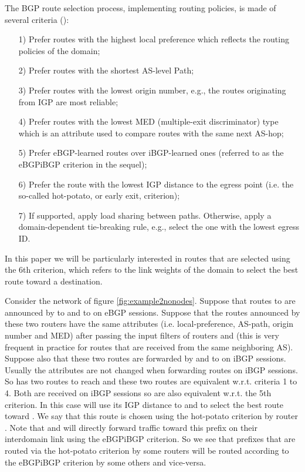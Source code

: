 \documentclass{acm_proc_article-sp}
\begin{document}
The BGP route selection process, implementing routing policies, is made of several criteria (\cite{bgp2,bgp3}):
\begin{itemize}
\item[1)] Prefer routes with the highest local preference which reflects the
  routing policies of the domain;
\item[2)] Prefer routes with the shortest AS-level Path;
\item[3)] Prefer routes with the lowest origin number, e.g., the routes
  originating from IGP are most reliable;
\item[4)] Prefer routes with the lowest MED (multiple-exit discriminator) type
  which is an attribute used to compare routes with the same next AS-hop;
\item[5)] Prefer eBGP-learned routes over iBGP-learned ones 
(referred to as the eBGPiBGP criterion in the sequel);
\item[6)] Prefer the route with the lowest IGP distance to the egress point (i.e. the so-called 
hot-potato, or early exit, criterion);
\item[7)] If supported, apply load sharing between paths. Otherwise, apply a
  domain-dependent tie-breaking rule, e.g., select the one with the lowest
  egress ID.
\end{itemize}

In this paper we will be particularly interested in routes that
are selected using the 6th criterion, which refers to the link weights of the
domain to select the best route toward a destination.

Consider the network of figure \ref{fig:example2nonodes}. Suppose that routes
to  are announced by  to  and  to  on eBGP
sessions. Suppose that the routes announced by these two routers have
the same attributes (i.e. local-preference, AS-path, origin number and
MED) after passing the input filters of routers  and  (this
is very frequent in practice for routes that are received from the
same neighboring AS). Suppose also that these two routes are forwarded
by  and  to  on iBGP sessions. Usually the attributes
are not changed when forwarding routes on iBGP sessions. So  has
two routes to reach  and these two routes are equivalent
w.r.t. criteria 1 to 4. Both are
received on iBGP sessions so are also equivalent w.r.t. the 5th criterion. In
this case  will use its IGP distance to  and  to select
the best route toward . We say that this route is
chosen using the hot-potato criterion by router . Note that 
and  will directly forward traffic toward this prefix on their interdomain link
using the eBGPiBGP criterion. So we see that prefixes that are
routed via the hot-potato criterion by some routers will be routed according to
the eBGPiBGP criterion by some others and vice-versa.
\end{document}
